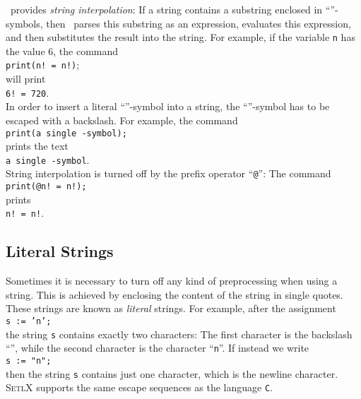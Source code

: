 \setlx\ provides \emph{string interpolation}:
If a string contains a substring enclosed in ``\texttt{}''-symbols, then \setlx\ 
parses this substring as an expression, evaluates this expression, and then substitutes the result
into the string.  For example, if the variable \texttt{n} has the value $6$, the command
\\[0.2cm]
\hspace*{1.3cm}
\texttt{print(n! = n!)};
\\[0.2cm]
will print
\\[0.2cm]
\hspace*{1.3cm}
\texttt{6! = 720}.
\\[0.2cm]
In order to insert a literal ``\texttt{}''-symbol into a string,  the
``\texttt{\symbol{36}}''-symbol has to be escaped with a backslash.  For example, the command
\\[0.2cm]
\hspace*{1.3cm}
\texttt{print(a single -symbol);}
\\[0.2cm]
prints the text
\\[0.2cm]
\hspace*{1.3cm}
\texttt{a single -symbol}.
\\[0.2cm]
String interpolation is turned off by the prefix operator ``\texttt{@}'':
The command
\\[0.2cm]
\hspace*{1.3cm}
\texttt{print(@n! = n!);}
\\[0.2cm]
prints
\\[0.2cm]
\hspace*{1.3cm}
\texttt{n! = n!}.

\subsection{Literal Strings}
Sometimes it is necessary to turn off any kind of preprocessing when using a string.  This
is achieved by enclosing the content of the string in single quotes.  These strings are
known as \emph{literal} strings.  For example, after
the assignment
\\[0.2cm]
\hspace*{1.3cm}
\texttt{s := 'n';}
\\[0.2cm]
the string \texttt{s} contains exactly two characters:  The first character is the
backslash ``\texttt{\symbol{92}}'', while the second character is the character ``\texttt{n}''.
If  instead we write
\\[0.2cm]
\hspace*{1.3cm}
\texttt{s := "n";}
\\[0.2cm]
then the string \texttt{s} contains just one character, which is the newline character.
\textsc{SetlX} supports the same escape sequences as the language \texttt{C}.

